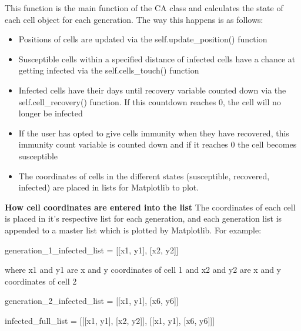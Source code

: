 \documentclass[11pt, a4paper]{article}
\begin{document}
This function is the main function of the CA class and calculates the state of each cell object for each generation. The way this happens is as follows:
\begin{itemize}
    \item Positions of cells are updated via the self.update\_position() function
    \item Susceptible cells within a specified distance of infected cells have a chance at getting infected via the self.cells\_touch() function
    \item Infected cells have their days until recovery variable counted down via the self.cell\_recovery() function. If this countdown reaches 0, the cell will no longer be infected
    \item If the user has opted to give cells immunity when they have recovered, this immunity count variable is counted down and if it reaches 0 the cell becomes susceptible
    \item The coordinates of cells in the different states (susceptible, recovered, infected) are placed in lists for Matplotlib to plot. 
\end{itemize}
\textbf{How cell coordinates are entered into the list}
The coordinates of each cell is placed in it's respective list for each generation, and each generation list is appended to a master list which is plotted by Matplotlib. For example:

generation\_1\_infected\_list = [[x1, y1], [x2, y2]] 

where x1 and y1 are x and y coordinates of cell 1 and x2 and y2 are x and y coordinates of cell 2

generation\_2\_infected\_list = [[x1, y1], [x6, y6]]

infected\_full\_list = [[[x1, y1], [x2, y2]], [[x1, y1], [x6, y6]]]
\end{document}
